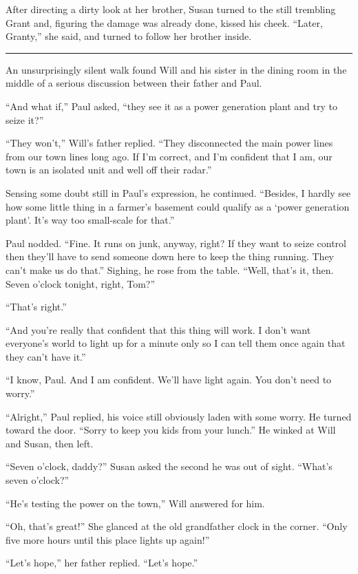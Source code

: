 \documentclass[12pt,letterpaper,oneside,english]{book}
\begin{document}
After directing a dirty look at her brother, Susan turned to the still
trembling Grant and, figuring the damage was already done, kissed his
cheek. ``Later, Granty,'' she said, and turned to follow her brother
inside.

\medskip
{\centering\rule{\linewidth}{1pt}}
\smallskip

An unsurprisingly silent walk found Will and his sister in the dining room
in the middle of a serious discussion between their father and Paul.

``And what if,'' Paul asked, ``they see it as a power generation plant and
try to seize it?''

``They won't,'' Will's father replied. ``They disconnected the main power
lines from our town lines long ago. If I'm correct, and I'm confident that
I am, our town is an isolated unit and well off their radar.''

Sensing some doubt still in Paul's expression, he continued. ``Besides, I
hardly see how some little thing in a farmer's basement could qualify as a
`power generation plant'. It's way too small-scale for that.''

Paul nodded. ``Fine. It runs on junk, anyway, right? If they want to seize
control then they'll have to send someone down here to keep the thing
running. They can't make us do that.'' Sighing, he rose from the table.
``Well, that's it, then. Seven o'clock tonight, right, Tom?''

``That's right.''

``And you're really that confident that this thing will work. I don't want
everyone's world to light up for a minute only so I can tell them once
again that they can't have it.''

``I know, Paul. And I am confident. We'll have light again. You don't need
to worry.''

``Alright,'' Paul replied, his voice still obviously laden with some
worry. He turned toward the door. ``Sorry to keep you kids from your
lunch.'' He winked at Will and Susan, then left.

``Seven o'clock, daddy?'' Susan asked the second he was out of sight.
``What's seven o'clock?''

``He's testing the power on the town,'' Will answered for him.

``Oh, that's great!'' She glanced at the old grandfather clock in the
corner. ``Only five more hours until this place lights up again!''

``Let's hope,'' her father replied. ``Let's hope.''
\end{document}
